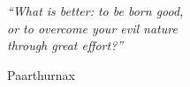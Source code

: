 \begin{epigrafe}
    \vspace*{\fill}
	\begin{flushright}
		\textit{``What is better: to be born good,\\or to overcome your evil nature\\through great effort?''}

		Paarthurnax
	\end{flushright}
\end{epigrafe}